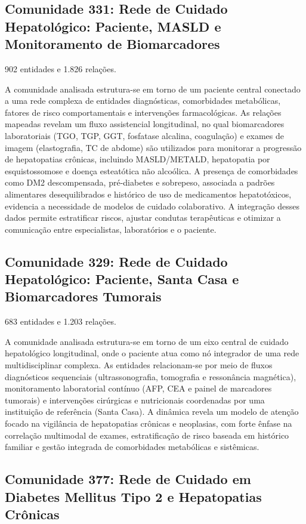 \subsection*{Comunidade 331: Rede de Cuidado Hepatológico: Paciente, MASLD e Monitoramento de Biomarcadores}

{\small 902 entidades e 1.826 relações.}

A comunidade analisada estrutura-se em torno de um paciente central conectado a uma rede complexa de entidades diagnósticas, comorbidades metabólicas, fatores de risco comportamentais e intervenções farmacológicas. As relações mapeadas revelam um fluxo assistencial longitudinal, no qual biomarcadores laboratoriais (TGO, TGP, GGT, fosfatase alcalina, coagulação) e exames de imagem (elastografia, TC de abdome) são utilizados para monitorar a progressão de hepatopatias crônicas, incluindo MASLD/METALD, hepatopatia por esquistossomose e doença esteatótica não alcoólica. A presença de comorbidades como DM2 descompensada, pré-diabetes e sobrepeso, associada a padrões alimentares desequilibrados e histórico de uso de medicamentos hepatotóxicos, evidencia a necessidade de modelos de cuidado colaborativo. A integração desses dados permite estratificar riscos, ajustar condutas terapêuticas e otimizar a comunicação entre especialistas, laboratórios e o paciente.

\subsection*{Comunidade 329: Rede de Cuidado Hepatológico: Paciente, Santa Casa e Biomarcadores Tumorais}

{\small 683 entidades e 1.203 relações.}

A comunidade analisada estrutura-se em torno de um eixo central de cuidado hepatológico longitudinal, onde o paciente atua como nó integrador de uma rede multidisciplinar complexa. As entidades relacionam-se por meio de fluxos diagnósticos sequenciais (ultrassonografia, tomografia e ressonância magnética), monitoramento laboratorial contínuo (AFP, CEA e painel de marcadores tumorais) e intervenções cirúrgicas e nutricionais coordenadas por uma instituição de referência (Santa Casa). A dinâmica revela um modelo de atenção focado na vigilância de hepatopatias crônicas e neoplasias, com forte ênfase na correlação multimodal de exames, estratificação de risco baseada em histórico familiar e gestão integrada de comorbidades metabólicas e sistêmicas.

\subsection*{Comunidade 377: Rede de Cuidado em Diabetes Mellitus Tipo 2 e Hepatopatias Crônicas}

